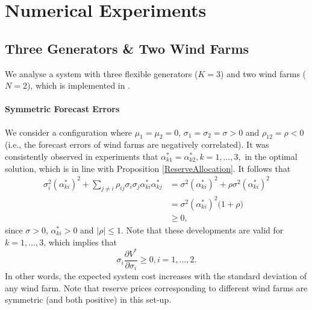 \documentclass{article}
\begin{document}
\section{Numerical Experiments}

\subsection{Three Generators \& Two Wind Farms}

We analyse a system with three flexible generators ($K = 3$) and two wind farms ($N = 2$), which is implemented in \cite{SMER2022}. 

\paragraph{Symmetric Forecast Errors} We consider a configuration where $\mu_1 = \mu_2 = 0$, $\sigma_1 = \sigma_2 = \sigma > 0$ and $\rho_{12} = \rho < 0$ (i.e., the forecast errors of wind farms are negatively correlated). It was consistently observed in experiments that $\alpha_{k1}^* = \alpha_{k2}^*, k = 1, \ldots, 3,$ in the optimal solution, which is in line with Proposition \ref{ReserveAllocation}. It follows that
\begin{align*}
\sigma_i^2 (\alpha_{ki}^*)^2 + \sum_{j \ne i} \rho_{ij} \sigma_i \sigma_j \alpha_{ki}^* \alpha_{kj}^* &= \sigma^2 (\alpha_{ki}^*)^2 + \rho \sigma^2 (\alpha_{ki}^*)^2\\
&= \sigma^2 (\alpha_{ki}^*)^2 \big(1 + \rho\big)\\
&\ge 0,
\end{align*}
since $\sigma > 0$, $\alpha_{ki}^* > 0$ and $|\rho| \le 1$. Note that these developments are valid for $k = 1, \ldots, 3$, which implies that 
\begin{equation*}
\sigma_i \frac{\partial V^*}{\partial \sigma_i} \ge 0, i = 1, \ldots, 2.
\end{equation*}
In other words, the expected system cost increases with the standard deviation of any wind farm. Note that reserve prices corresponding to different wind farms are symmetric (and both positive) in this set-up.
\end{document}
